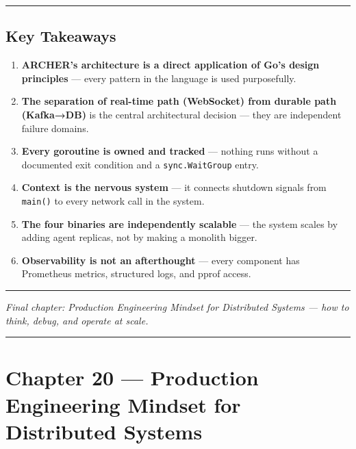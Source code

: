 \documentclass[
]{article}
\providecommand{\tightlist}{%
  \setlength{\itemsep}{0pt}\setlength{\parskip}{0pt}}
\begin{document}
\begin{center}\rule{0.5\linewidth}{0.5pt}\end{center}

\hypertarget{key-takeaways-2}{%
\subsection{Key Takeaways}\label{key-takeaways-2}}

\begin{enumerate}
\def\labelenumi{\arabic{enumi}.}
\tightlist
\item
  \textbf{ARCHER's architecture is a direct application of Go's design
  principles} --- every pattern in the language is used purposefully.
\item
  \textbf{The separation of real-time path (WebSocket) from durable path
  (Kafka→DB)} is the central architectural decision --- they are
  independent failure domains.
\item
  \textbf{Every goroutine is owned and tracked} --- nothing runs without
  a documented exit condition and a \texttt{sync.WaitGroup} entry.
\item
  \textbf{Context is the nervous system} --- it connects shutdown
  signals from \texttt{main()} to every network call in the system.
\item
  \textbf{The four binaries are independently scalable} --- the system
  scales by adding agent replicas, not by making a monolith bigger.
\item
  \textbf{Observability is not an afterthought} --- every component has
  Prometheus metrics, structured logs, and pprof access.
\end{enumerate}

\begin{center}\rule{0.5\linewidth}{0.5pt}\end{center}

\emph{Final chapter: Production Engineering Mindset for Distributed
Systems --- how to think, debug, and operate at scale.}

\begin{center}\rule{0.5\linewidth}{0.5pt}\end{center}

\hypertarget{chapter-20-production-engineering-mindset-for-distributed-systems}{%
\section{Chapter 20 --- Production Engineering Mindset for Distributed
Systems}\label{chapter-20-production-engineering-mindset-for-distributed-systems}}
\end{document}
